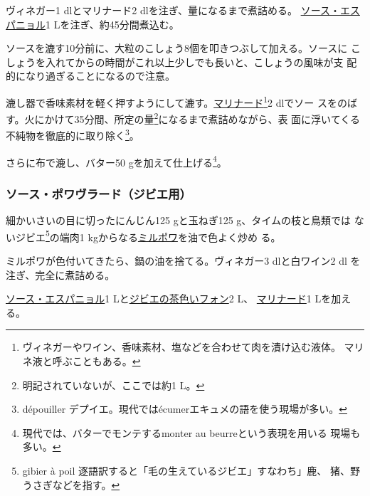 \begin{recette}
ヴィネガー1 dlとマリナード2 dlを注ぎ、\untiers{}量になるまで煮詰める。
\protect\hyperlink{sauce-espagnole}{ソース・エスパニョル}1
Lを注ぎ、約45分間煮込む。

ソースを漉す10分前に、大粒のこしょう8個を叩きつぶして加える。ソースに
こしょうを入れてからの時間がこれ以上少しでも長いと、こしょうの風味が支
配的になり過ぎることになるので注意。

漉し器で香味素材を軽く押すようにして漉す。\protect\hyperlink{marinades-et-saumuresux5cux257D}{マリナード}\footnote{ヴィネガーやワイン、香味素材、塩などを合わせて肉を漬け込む液体。
  マリネ液と呼ぶこともある。}2 dlでソー
スをのばす。火にかけて35分間、所定の量\footnote{明記されていないが、ここでは約1
  L。}になるまで煮詰めながら、表
面に浮いてくる不純物を徹底的に取り除く\footnote{dépouiller
  デプイエ。現代ではécumerエキュメの語を使う現場が多い。}。

さらに布で漉し、バター50 gを加えて仕上げる\footnote{現代では、バターでモンテするmonter
  au beurreという表現を用いる 現場も多い。}。

\hypertarget{sauce-poivrade-pour-gibier}{%
\subsubsection{ソース・ポワヴラード（ジビエ用）}\label{sauce-poivrade-pour-gibier}}



細かいさいの目に切ったにんじん125 gと玉ねぎ125 g、タイムの枝と鳥類では
ないジビエ\footnote{gibier à poil
  逐語訳すると「毛の生えているジビエ」すなわち」鹿、
  猪、野うさぎなどを指す。}の端肉1
kgからなる\protect\hyperlink{mirepoix}{ミルポワ}を油で色よく炒め る。

ミルポワが色付いてきたら、鍋の油を捨てる。ヴィネガー3 dlと白ワイン2 dl
を注ぎ、完全に煮詰める。

\protect\hyperlink{sauce-espagnole}{ソース・エスパニョル}1
Lと\protect\hyperlink{fonds-de-gibier}{ジビエの茶色いフォン}2 L、
\protect\hyperlink{marinades-et-saumures}{マリナード}1 Lを加える。


\end{recette}
